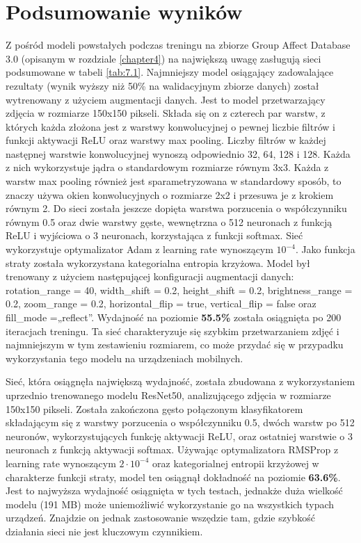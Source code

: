 \section{Podsumowanie wyników}
Z pośród modeli powstałych podczas treningu na zbiorze Group Affect Database 3.0 (opisanym w rozdziale \ref{chapter4}) na największą uwagę zasługują sieci podsumowane w tabeli \ref{tab:7.1}. Najmniejszy model osiągający zadowalające rezultaty (wynik wyższy niż 50\% na walidacyjnym zbiorze danych) został wytrenowany z użyciem augmentacji danych. Jest to model przetwarzający zdjęcia w rozmiarze 150x150 pikseli. Składa się on z czterech par warstw, z których każda złożona jest z warstwy konwolucyjnej o pewnej liczbie filtrów i funkcji aktywacji ReLU oraz warstwy max pooling. Liczby filtrów w każdej następnej warstwie konwolucyjnej wynoszą odpowiednio 32, 64, 128 i 128. Każda z nich wykorzystuje jądra o standardowym rozmiarze równym 3x3. Każda z warstw max pooling również jest sparametryzowana w standardowy sposób, to znaczy używa okien konwolucyjnych o rozmiarze 2x2 i przesuwa je z krokiem równym 2. Do sieci została jeszcze dopięta warstwa porzucenia o współczynniku równym 0.5 oraz dwie warstwy gęste, wewnętrzna o 512 neuronach z funkcją ReLU i wyjściowa o 3 neuronach, korzystająca z funkcji softmax. Sieć wykorzystuje optymalizator Adam z learning rate wynoszącym $10^{-4}$. Jako funkcja straty została wykorzystana kategorialna entropia krzyżowa. Model był trenowany z użyciem następującej konfiguracji augmentacji danych: rotation\_range = 40, width\_shift = 0.2, height\_shift = 0.2, brightness\_range = 0.2, zoom\_range = 0.2, horizontal\_flip = true, vertical\_flip = false oraz fill\_mode =„reflect”. Wydajność na poziomie \textbf{55.5\%} została osiągnięta po 200 iteracjach treningu. Ta sieć charakteryzuje się szybkim przetwarzaniem zdjęć i najmniejszym w tym zestawieniu rozmiarem, co może przydać się w przypadku wykorzystania tego modelu na urządzeniach mobilnych.

Sieć, która osiągnęła największą wydajność, została zbudowana z wykorzystaniem uprzednio trenowanego modelu ResNet50, analizującego zdjęcia w rozmiarze 150x150 pikseli. Została zakończona gęsto połączonym klasyfikatorem składającym się z warstwy porzucenia o współczynniku 0.5, dwóch warstw po 512 neuronów, wykorzystujących funkcję aktywacji ReLU, oraz ostatniej warstwie o 3 neuronach z funkcją aktywacji softmax. Używając optymalizatora RMSProp z learning rate wynoszącym $2\cdot10^{-4}$ oraz kategorialnej entropii krzyżowej w charakterze funkcji straty, model ten osiągnął dokładność na poziomie \textbf{63.6\%}. Jest to najwyższa wydajność osiągnięta w tych testach, jednakże duża wielkość modelu (191 MB) może uniemożliwić wykorzystanie go na wszystkich typach urządzeń. Znajdzie on jednak zastosowanie wszędzie tam, gdzie szybkość działania sieci nie jest kluczowym czynnikiem.

